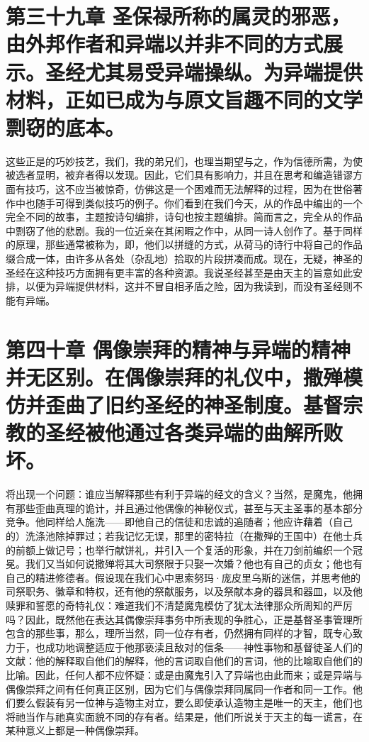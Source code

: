 
\section{第三十九章 圣保禄所称的属灵的邪恶，由外邦作者和异端以并非不同的方式展示。圣经尤其易受异端操纵。为异端提供材料，正如已成为与原文旨趣不同的文学剽窃的底本。}

这些正是的巧妙技艺，我们，我的弟兄们，也理当期望与之，作为信德所需，为使被选者显明，被弃者得以发现。因此，它们具有影响力，并且在思考和编造错谬方面有技巧，这不应当被惊奇，仿佛这是一个困难而无法解释的过程，因为在世俗著作中也随手可得到类似技巧的例子。你们看到在我们今天，从的作品中编出的一个完全不同的故事，主题按诗句编排，诗句也按主题编排。简而言之，完全从的作品中剽窃了他的悲剧。我的一位近亲在其闲暇之作中，从同一诗人创作了。基于同样的原理，那些通常被称为，即，他们以拼缝的方式，从荷马的诗行中将自己的作品缀合成一体，由许多从各处（杂乱地）拾取的片段拼凑而成。现在，无疑，神圣的圣经在这种技巧方面拥有更丰富的各种资源。我说圣经甚至是由天主的旨意如此安排，以便为异端提供材料，这并不冒自相矛盾之险，因为我读到，而没有圣经则不能有异端。\par


\section{第四十章 偶像崇拜的精神与异端的精神并无区别。在偶像崇拜的礼仪中，撒殚模仿并歪曲了旧约圣经的神圣制度。基督宗教的圣经被他通过各类异端的曲解所败坏。}

将出现一个问题：谁应当解释那些有利于异端的经文的含义？当然，是魔鬼，他拥有那些歪曲真理的诡计，并且通过他偶像的神秘仪式，甚至与天主圣事的基本部分竞争。他同样给人施洗——即他自己的信徒和忠诚的追随者；他应许藉着（自己的）洗涤池除掉罪过；若我记忆无误，那里的密特拉（在撒殚的王国中）在他士兵的前额上做记号；也举行献饼礼，并引入一个复活的形象，并在刀剑前编织一个冠冕。我们又当如何说撒殚将其大司祭限于只娶一次婚？他也有自己的贞女；他也有自己的精进修德者。假设现在我们心中思索努玛·庞皮里乌斯的迷信，并思考他的司祭职务、徽章和特权，还有他的祭献服务，以及祭献本身的器具和器皿，以及他赎罪和誓愿的奇特礼仪：难道我们不清楚魔鬼模仿了犹太法律那众所周知的严厉吗？因此，既然他在表达其偶像崇拜事务中所表现的争胜心，正是基督圣事管理所包含的那些事，那么，理所当然，同一位存有者，仍然拥有同样的才智，既专心致力于，也成功地调整适应于他那亵渎且敌对的信条——神性事物和基督徒圣人们的文献：他的解释取自他们的解释，他的言词取自他们的言词，他的比喻取自他们的比喻。因此，任何人都不应怀疑：或是由魔鬼引入了异端也由此而来；或是异端与偶像崇拜之间有任何真正区别，因为它们与偶像崇拜同属同一作者和同一工作。他们要么假装有另一位神与造物主对立，要么即使承认造物主是唯一的天主，他们也将祂当作与祂真实面貌不同的存有者。结果是，他们所说关于天主的每一谎言，在某种意义上都是一种偶像崇拜。\par

